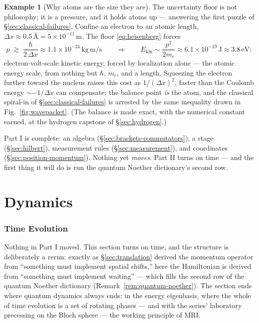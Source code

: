 \documentclass[11pt]{article}
\theoremstyle{plain}
\theoremstyle{definition}
\newtheorem{example}[theorem]{Example}
\theoremstyle{remark}
\begin{document}
\begin{example}[Why atoms are the size they are]
\label{ex:atomic-size}
The uncertainty floor is not philosophy; it is a pressure, and it
holds atoms up --- answering the first puzzle of
\S\ref{sec:classical-failures}. Confine an electron to an
atomic length, $\Delta x \approx 0.5\,\text{\AA} =
5\times10^{-11}\,\mathrm m$. The floor \eqref{eq:heisenberg} forces
\begin{equation}
  p \;\gtrsim\; \frac{\hbar}{2\,\Delta x}
  \approx 1.1\times10^{-24}\,\mathrm{kg\,m/s}
  \qquad\Longrightarrow\qquad
  E_{\text{kin}} \sim \frac{p^2}{2m_e}
  \approx 6.1\times10^{-19}\,\mathrm J
  \approx 3.8\,\mathrm{eV} :
\end{equation}
electron-volt-scale kinetic energy, forced by localization alone
--- the atomic energy scale, from nothing but $\hbar$, $m_e$, and a
length. Squeezing the electron further toward the nucleus raises
this cost as $1/(\Delta x)^2$, faster than the Coulomb energy
$\sim -1/\Delta x$ can compensate; the balance point \emph{is} the atom,
and the classical spiral-in of
\S\ref{sec:classical-failures} is arrested by the same inequality
drawn in Fig.~\ref{fig:wavepacket}. (The balance is made exact, with
the numerical constant earned, at the hydrogen capstone of
\S\ref{sec:hydrogen}.)
\end{example}

\medskip
\noindent
Part I is complete: an algebra (\S\ref{sec:brackets-commutators}), a
stage (\S\ref{sec:hilbert}), measurement rules
(\S\ref{sec:measurement}), and coordinates
(\S\ref{sec:position-momentum}). Nothing yet \emph{moves}. Part II
turns on time --- and the first thing it will do is run the quantum
Noether dictionary's second row.


\clearpage
\part{Dynamics}

\section{Time Evolution}
\label{sec:evolution}

Nothing in Part I moved. This section turns on time, and the
structure is deliberately a rerun: exactly as \S\ref{sec:translation}
derived the momentum operator from ``something must implement
spatial shifts,'' here the Hamiltonian is derived from ``something
must implement waiting'' --- which fills the second
row of the quantum Noether dictionary
(Remark~\ref{rem:quantum-noether}). The
section ends where quantum dynamics always ends: in the energy
eigenbasis, where the whole of time evolution is a set of rotating
phases --- and with the series' laboratory precessing on the Bloch
sphere --- the working principle of MRI.
\end{document}
